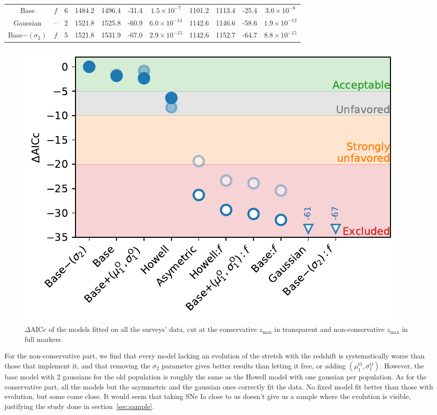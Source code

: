 \documentclass[]{aa} %
\begin{document}
\begin{table}
\begin{tabular}{c c c  c c c c  c c c c}
        Base & $f$ & 6
        & 1484.2 & 1496.4 & -31.4 & $1.5\times10^{-7}$
        & 1101.2 & 1113.4 & -25.4 & $3.0\times10^{-6}$\\[0.15em]

        Gaussian & -- & 2
        & 1521.8 & 1525.8 & -60.9 & $6.0\times10^{-14}$
        & 1142.6 & 1146.6 & -58.6 & $1.9\times10^{-13}$ \\[0.15em]

        Base$-(\sigma_2)$ & $f$ & 5
        & 1521.8 & 1531.9 & -67.0 & $2.9\times10^{-15}$
        & 1142.6 & 1152.7 & -64.7 & $8.8\times10^{-15}$\\\hline

    \end{tabular}
\end{table}

\begin{figure}
    \centering
    \includegraphics[width=\linewidth]{Article_figures/mod_comp.pdf}
    \caption{$\Delta$AICc of the models fitted on all the surveys' data, cut at
    the conservative $z_{\mathrm{max}}$ in transparent and non-conservative
$z_{\mathrm{max}}$ in full markers.}
    \label{fig:mod_comp}
\end{figure}

For the non-conservative part, we find that every model lacking an evolution of
the stretch with the redshift is systematically worse than those that implement
it, and that removing the $\sigma_2$ parameter gives better results than letting
it free, or adding $(\mu_1^{\mathrm{O}}, \sigma_1^{\mathrm{O}})$. However, the
base model with 2 gaussians for the old population is roughly the same as the
Howell model with one gaussian per population. As for the conservative part, all
the models but the asymmetric and the gaussian ones correctly fit the data. No
fixed model fit better than those with evolution, but some come close. It would
seem that taking SNe Ia close to us doesn't give us a sample where the evolution
is visible, justifying the study done in section~\ref{sec:sample}.
\end{document}
